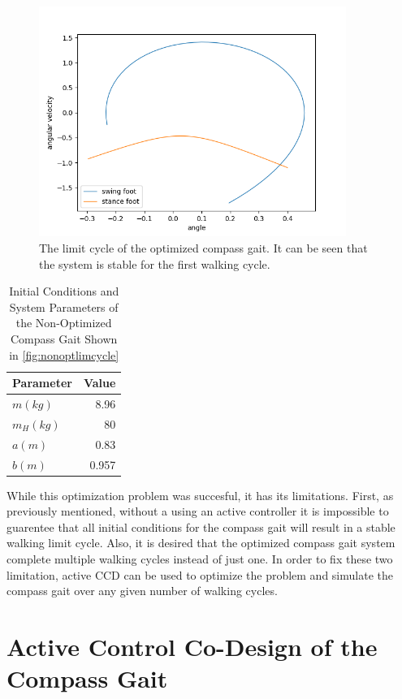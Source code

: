 \documentclass{./springer/svjour3}
\begin{document}
\begin{figure}[h]
\centering
\includegraphics[width=10cm]{./figures/passiveopt_limitcycle.png}
\caption{The limit cycle of the optimized compass gait. It can be seen that the system is stable for the first walking cycle.}
\label{fig:passiveopt}
\end{figure}

\begin{table}[h]
\centering
\caption{Initial Conditions and System Parameters of the Non-Optimized Compass Gait Shown in \ref{fig:nonoptlimcycle}}
\begin{tabular}{lr}
\toprule
Parameter & Value \\
\midrule
$m (kg)$ & 8.96 \\
$m_H (kg)$ & 80 \\
$a (m)$ & 0.83 \\
$b (m)$ & 0.957 \\
\bottomrule
\end{tabular}
\label{tab:optparam}
\end{table}

While this optimization problem was succesful, it has its limitations. First, as previously mentioned, without a using an active controller
it is impossible to guarentee that all initial conditions for the compass gait will result in a stable walking limit cycle. Also, it is desired that the optimized
compass gait system complete multiple walking cycles instead of just one. In order to fix these two limitation, active CCD can be used to optimize the problem 
and simulate the compass gait over any given number of walking cycles.

\clearpage

\section{Active Control Co-Design of the Compass Gait}
\end{document}
